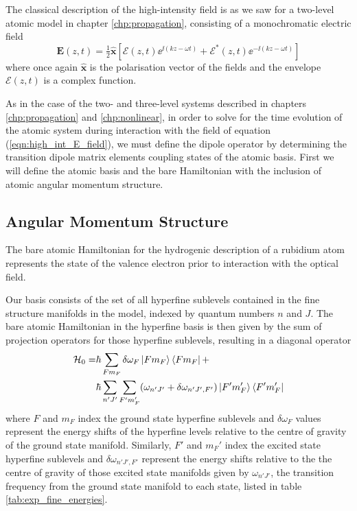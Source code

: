     The classical description of the high-intensity field is as we saw for a
    two-level atomic model in chapter \ref{chp:propagation}, consisting of a monochromatic electric field
    \begin{equation}
      \mathbf{E}(z,t) = \tfrac{1}{2} \mathbf{\hat{x}}  \left[ \mathcal{E}(z,t) 
          \ee^{\ii(k z - \omega t)} + \mathcal{E}^*(z,t) 
          \ee^{-\ii(k z - \omega t)} \right]
      \label{eqn:high_int_E_field}
    \end{equation}
    where once again $\mathbf{\hat{x}}$ is the polarisation vector of the fields
    and the envelope $\mathcal{E}(z,t)$ is a complex function.

    As in the case of the two- and three-level systems described in chapters
    \ref{chp:propagation} and \ref{chp:nonlinear}, in order to solve for the
    time evolution of the atomic system during interaction with the field of
    equation (\ref{eqn:high_int_E_field}), we must define the dipole operator by
    determining the transition dipole matrix elements coupling states of the
    atomic basis. First we will define the atomic basis and the bare Hamiltonian
    with the inclusion of atomic angular momentum structure.

  \subsection{Angular Momentum Structure}  

    The bare atomic Hamiltonian for the hydrogenic description of a rubidium
    atom represents the state of the valence electron prior to interaction with
    the optical field.

    Our basis consists of the set of all hyperfine sublevels contained in the
    fine structure manifolds in the model, indexed by quantum numbers $n$ and
    $J$. The bare atomic Hamiltonian in the hyperfine basis is then given by the
    sum of projection operators for those hyperfine sublevels, resulting in a
    diagonal operator
    \begin{align}
      \mathcal{H}_0 = &\hbar \sum_{F m_F} \delta \omega_F 
                        \Ket{F m_F} \Bra{F m_F} + \nonumber \\
      &\hbar \sum_{n' J'} \sum_{F' m_F'} (\omega_{n' J'} + 
        \delta \omega_{n' J', F'}) \Ket{F' m'_F} \Bra{F' m'_F}
    \end{align}
    where $F$ and $m_F$ index the ground state hyperfine sublevels and $\delta
    \omega_F$ values represent the energy shifts of the hyperfine levels
    relative to  the centre of gravity of the ground state manifold. Similarly,
    $F'$ and $m_F'$ index the excited state hyperfine sublevels and $\delta
    \omega_{n' J', F'}$ represent the energy shifts relative to the the centre
    of gravity of those excited state manifolds given by $\omega_{n' J'}$, the
    transition frequency from the ground state manifold to each state, listed in
    table \ref{tab:exp_fine_energies}.

